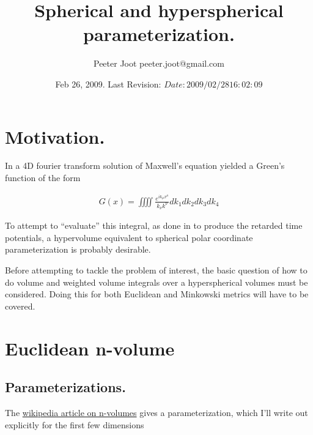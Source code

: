 \documentclass{article}
\title{ Spherical and hyperspherical parameterization. }
\author{Peeter Joot \quad peeter.joot@gmail.com }
\date{ Feb 26, 2009.  Last Revision: $Date: 2009/02/28 16:02:09 $ }
\begin{document}
\maketitle{}
\tableofcontents

\section{ Motivation. }

In \cite{PJ4dFourier} a 4D fourier transform solution 
of Maxwell's equation yielded a Green's function of the form

\begin{align*}
G(x) = \iiiint \frac{e^{i k_\mu x^\mu}}{k_\nu k^\nu} dk_1 dk_2 dk_3 dk_4
\end{align*}

To attempt to ``evaluate'' this integral, as done in
\cite{PJpoisson}
to produce the retarded time potentials,
a hypervolume equivalent to spherical polar coordinate
parameterization is probably desirable.

Before attempting to tackle the problem of interest, the basic question
of how to do volume and weighted volume integrals over a hyperspherical volumes
must be considered.  Doing this for both Euclidean and Minkowski metrics will have to be covered.

\section{ Euclidean n-volume }

\subsection{ Parameterizations. }

The \href{http://en.wikipedia.org/wiki/Hypersphere}{wikipedia article on n-volumes} gives a parameterization, which I'll write out explicitly for the first few dimensions
\end{document}
